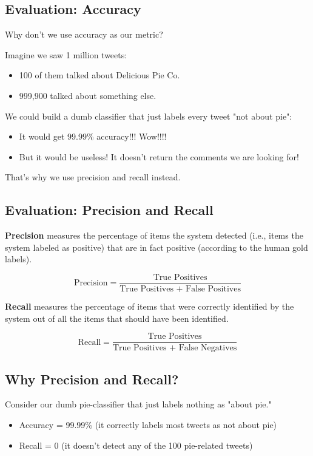 \subsection{Evaluation: Accuracy}
Why don't we use accuracy as our metric?

Imagine we saw 1 million tweets:
\begin{itemize}
\item 100 of them talked about Delicious Pie Co.
\item 999,900 talked about something else.
\end{itemize}

We could build a dumb classifier that just labels every tweet "not about pie":
\begin{itemize}
\item It would get 99.99\% accuracy!!! Wow!!!!
\item But it would be useless! It doesn't return the comments we are looking for!
\end{itemize}

That's why we use precision and recall instead.

\subsection{Evaluation: Precision and Recall}
\textbf{Precision} measures the percentage of items the system detected (i.e., items the system labeled as positive) that are in fact positive (according to the human gold labels).

\[
\text{Precision} = \frac{\text{True Positives}}{\text{True Positives + False Positives}}
\]


\textbf{Recall} measures the percentage of items that were correctly identified by the system out of all the items that should have been identified.

\[
\text{Recall} = \frac{\text{True Positives}}{\text{True Positives + False Negatives}}
\]



\subsection{Why Precision and Recall?}
Consider our dumb pie-classifier that just labels nothing as "about pie."

\begin{itemize}
  \item Accuracy = 99.99\% (it correctly labels most tweets as not about pie)
  \item Recall = 0 (it doesn't detect any of the 100 pie-related tweets)
\end{itemize}

